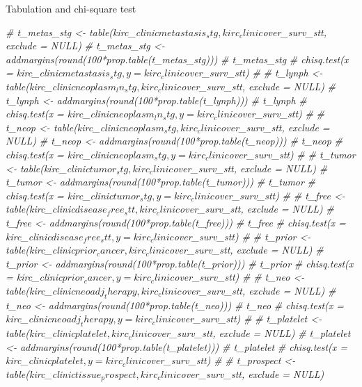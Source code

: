 \documentclass[]{article}
\newenvironment{Shaded}{\begin{snugshade}}{\end{snugshade}}
\newcommand{\CommentTok}[1]{\textcolor[rgb]{0.56,0.35,0.01}{\textit{#1}}}
\begin{document}
Tabulation and chi-square test

\begin{Shaded}
\begin{Highlighting}[]
\CommentTok{# t_metas_stg <- table(kirc_clinic$metastasis_stg, kirc_clinic$over_surv_stt, exclude = NULL)}
\CommentTok{# t_metas_stg <- addmargins(round(100*prop.table(t_metas_stg)))}
\CommentTok{# t_metas_stg}
\CommentTok{# chisq.test(x = kirc_clinic$metastasis_stg, y = kirc_clinic$over_surv_stt) }
\CommentTok{# }
\CommentTok{# t_lynph <- table(kirc_clinic$neoplasm_ln_stg, kirc_clinic$over_surv_stt, exclude = NULL)}
\CommentTok{# t_lynph <- addmargins(round(100*prop.table(t_lynph)))}
\CommentTok{# t_lynph}
\CommentTok{# chisq.test(x = kirc_clinic$neoplasm_ln_stg, y = kirc_clinic$over_surv_stt) }
\CommentTok{# }
\CommentTok{# t_neop <- table(kirc_clinic$neoplasm_stg, kirc_clinic$over_surv_stt, exclude = NULL)}
\CommentTok{# t_neop <- addmargins(round(100*prop.table(t_neop)))}
\CommentTok{# t_neop}
\CommentTok{# chisq.test(x = kirc_clinic$neoplasm_stg, y = kirc_clinic$over_surv_stt) }
\CommentTok{# }
\CommentTok{# t_tumor <- table(kirc_clinic$tumor_stg, kirc_clinic$over_surv_stt, exclude = NULL)}
\CommentTok{# t_tumor <- addmargins(round(100*prop.table(t_tumor)))}
\CommentTok{# t_tumor}
\CommentTok{# chisq.test(x = kirc_clinic$tumor_stg, y = kirc_clinic$over_surv_stt) }
\CommentTok{# }
\CommentTok{# t_free <- table(kirc_clinic$disease_free_stt, kirc_clinic$over_surv_stt, exclude = NULL)}
\CommentTok{# t_free <- addmargins(round(100*prop.table(t_free)))}
\CommentTok{# t_free}
\CommentTok{# chisq.test(x = kirc_clinic$disease_free_stt, y = kirc_clinic$over_surv_stt) }
\CommentTok{# }
\CommentTok{# t_prior <- table(kirc_clinic$prior_cancer, kirc_clinic$over_surv_stt, exclude = NULL)}
\CommentTok{# t_prior <- addmargins(round(100*prop.table(t_prior)))}
\CommentTok{# t_prior}
\CommentTok{# chisq.test(x = kirc_clinic$prior_cancer, y = kirc_clinic$over_surv_stt) }
\CommentTok{# }
\CommentTok{# t_neo <- table(kirc_clinic$neoadj_therapy, kirc_clinic$over_surv_stt, exclude = NULL)}
\CommentTok{# t_neo <- addmargins(round(100*prop.table(t_neo)))}
\CommentTok{# t_neo}
\CommentTok{# chisq.test(x = kirc_clinic$neoadj_therapy, y = kirc_clinic$over_surv_stt) }
\CommentTok{# }
\CommentTok{# t_platelet <- table(kirc_clinic$platelet, kirc_clinic$over_surv_stt, exclude = NULL)}
\CommentTok{# t_platelet <- addmargins(round(100*prop.table(t_platelet)))}
\CommentTok{# t_platelet}
\CommentTok{# chisq.test(x = kirc_clinic$platelet, y = kirc_clinic$over_surv_stt)}
\CommentTok{# }
\CommentTok{# t_prospect <- table(kirc_clinic$tissue_prospect, kirc_clinic$over_surv_stt, exclude = NULL)}

\end{Highlighting}
\end{Shaded}
\end{document}
